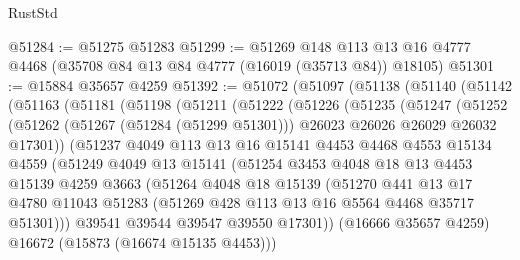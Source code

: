 \begin{lexlean}{RustStd}
\begin{coremodule}
@51284 := @51275 @51283
@51299 := @51269
    @148
    @113
    @13
    @16
    @4777
    @4468
    (@35708 @84 @13 @84 @4777 (@16019 (@35713 @84)) @18105)
@51301 := @15884 @35657 @4259
@51392 := @51072
    (@51097
      (@51138
        (@51140
          (@51142
            (@51163
              (@51181
                (@51198
                  (@51211
                    (@51222
                      (@51226
                        (@51235
                          (@51247
                            (@51252
                              (@51262
                                (@51267 (@51284 (@51299 @51301)))
                                @26023
                                @26026
                                @26029
                                @26032
                                @17301))
                            (@51237
                              @4049
                              @113
                              @13
                              @16
                              @15141
                              @4453
                              @4468
                              @4553
                              @15134
                              @4559
                              (@51249
                                @4049
                                @13
                                @15141
                                (@51254
                                  @3453
                                  @4048
                                  @18
                                  @13
                                  @4453
                                  @15139
                                  @4259
                                  @3663
                                  (@51264
                                    @4048
                                    @18
                                    @15139
                                    (@51270
                                      @441
                                      @13
                                      @17
                                      @4780
                                      @11043
                                      @51283
                                      (@51269 @428 @113 @13 @16 @5564 @4468 @35717 @51301)))
                                  @39541
                                  @39544
                                  @39547
                                  @39550
                                  @17301))
                              (@16666 @35657 @4259)
                              @16672
                              (@15873 (@16674 @15135 @4453)))

\end{coremodule}
\end{lexlean}
